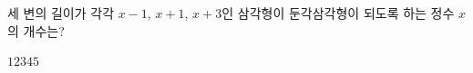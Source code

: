 세 변의 길이가 각각 $x-1$, $x+1$, $x+3$인 삼각형이 둔각삼각형이 되도록 하는 정수 $x$의 개수는?
\begin{choices32}{$1$}{$2$}{$3$}{$4$}{$5$}\end{choices32}
